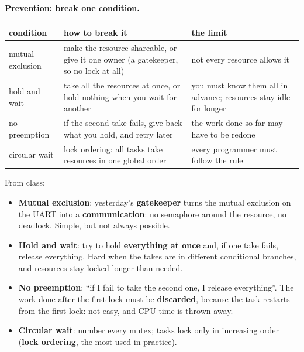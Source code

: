 \paragraph{Prevention: break one condition.}
\begin{center}
\small
\begin{tabular}{P{0.15} P{0.42} P{0.33}}
    \hline
    \textbf{condition} & \textbf{how to break it} & \textbf{the limit} \\
    \hline
    mutual exclusion & make the resource shareable, or give it one owner (a gatekeeper, so no lock at all) & not every resource allows it \\
    hold and wait & take all the resources at once, or hold nothing when you wait for another & you must know them all in advance; resources stay idle for longer \\
    no preemption & if the second take fails, give back what you hold, and retry later & the work done so far may have to be redone \\
    circular wait & lock ordering: all tasks take resources in one global order & every programmer must follow the rule \\
    \hline
\end{tabular}
\end{center}
From class:
\begin{itemize}
    \item \textbf{Mutual exclusion}: yesterday's \textbf{gatekeeper} turns the mutual exclusion on the UART into a \textbf{communication}: no semaphore around the resource, no deadlock. Simple, but not always possible.
    \item \textbf{Hold and wait}: try to hold \textbf{everything at once} and, if one take fails, release everything. Hard when the takes are in different conditional branches, and resources stay locked longer than needed.
    \item \textbf{No preemption}: ``if I fail to take the second one, I release everything''. The work done after the first lock must be \textbf{discarded}, because the task restarts from the first lock: not easy, and CPU time is thrown away.
    \item \textbf{Circular wait}: number every mutex; tasks lock only in increasing order (\textbf{lock ordering}, the most used in practice).
\end{itemize}

